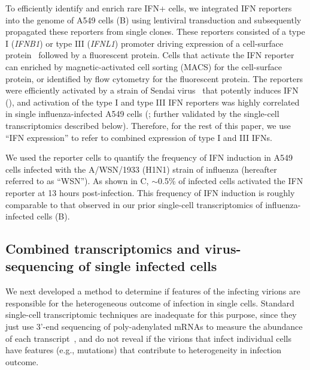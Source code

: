 \documentclass[9pt,lineno]{elife}
\begin{document}
To efficiently identify and enrich rare IFN+ cells, we integrated IFN reporters into the genome of A549 cells (B) using lentiviral transduction and subsequently propagated these reporters from single clones.
These reporters consisted of a type I (\textit{IFNB1}) or type III (\textit{IFNL1}) promoter driving expression of a cell-surface protein~\citep[LNGFR$\Delta$C;][]{bonini1997hsv,ruggieri1997cell} followed by a fluorescent protein.
Cells that activate the IFN reporter can enriched by magnetic-activated cell sorting (MACS) for the cell-surface protein, or identified by flow cytometry for the fluorescent protein.
The reporters were efficiently activated by a strain of Sendai virus~\citep{strahle2006sendai} that potently induces IFN (), and activation of the type I and type III IFN reporters was highly correlated in single influenza-infected A549 cells (; further validated by the single-cell transcriptomics described below).
Therefore, for the rest of this paper, we use ``IFN expression'' to refer to combined expression of type I and III IFNs. 

We used the reporter cells to quantify the frequency of IFN induction in A549 cells infected with the A/WSN/1933 (H1N1) strain of influenza (hereafter referred to as ``WSN'').
As shown in C, $\sim$0.5\% of infected cells activated the IFN reporter at 13 hours post-infection.
This frequency of IFN induction is roughly comparable to that observed in our prior single-cell transcriptomics of influenza-infected cells (B).

\subsection{Combined transcriptomics and virus-sequencing of single infected cells}
We next developed a method to determine if features of the infecting virions are responsible for the heterogeneous outcome of infection in single cells.
Standard single-cell transcriptomic techniques are inadequate for this purpose, since they just use 3'-end sequencing of poly-adenylated mRNAs to measure the abundance of each transcript~\citep{klein2015droplet, macosko2015highly, zheng2017massively, cao2017comprehensive, gierahn2017seq}, and do not reveal if the virions that infect individual cells have features (e.g., mutations) that contribute to heterogeneity in infection outcome. 
\end{document}
